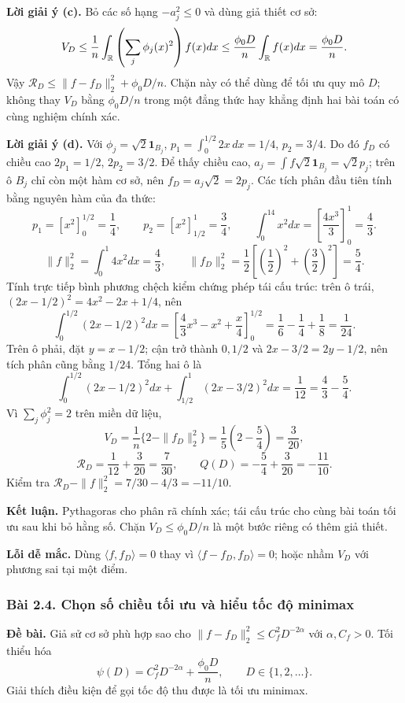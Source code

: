 \textbf{Lời giải ý (c).}
Bỏ các số hạng $-a_j^2\leq0$ và dùng giả thiết cơ sở:
\[
V_D\leq\frac1n\int_{\mathbb R}\left(\sum_j\phi_j(x)^2\right)f(x)dx
\leq\frac{\phi_0D}{n}\int_{\mathbb R}f(x)dx=\frac{\phi_0D}{n}.
\]
Vậy $\mathcal R_D\leq\|f-f_D\|_2^2+\phi_0D/n$.
Chặn này có thể dùng để tối ưu quy mô $D$; không thay $V_D$ bằng $\phi_0D/n$
trong một đẳng thức hay khẳng định hai bài toán có cùng nghiệm chính xác.

\textbf{Lời giải ý (d).}
Với $\phi_j=\sqrt2\mathbf1_{B_j}$,
$p_1=\int_0^{1/2}2x\,dx=1/4$, $p_2=3/4$.
Do đó $f_D$ có chiều cao $2p_1=1/2$, $2p_2=3/2$.
Để thấy chiều cao, $a_j=\int f\sqrt2\mathbf1_{B_j}=\sqrt2p_j$;
trên ô $B_j$ chỉ còn một hàm cơ sở, nên $f_D=a_j\sqrt2=2p_j$.
Các tích phân đầu tiên tính bằng nguyên hàm của đa thức:
\[
p_1=[x^2]_0^{1/2}=\frac14,\qquad
p_2=[x^2]_{1/2}^1=\frac34,\qquad
\int_0^14x^2dx=\left[\frac{4x^3}{3}\right]_0^1=\frac43.
\]
\[
\|f\|_2^2=\int_0^1 4x^2dx=\frac43,\qquad
\|f_D\|_2^2=\frac12\left[\left(\frac12\right)^2+\left(\frac32\right)^2\right]=\frac54.
\]
Tính trực tiếp bình phương chệch kiểm chứng phép tái cấu trúc:
trên ô trái, $(2x-1/2)^2=4x^2-2x+1/4$, nên
\[
\int_0^{1/2}(2x-1/2)^2dx
=\left[\frac43x^3-x^2+\frac x4\right]_0^{1/2}
=\frac16-\frac14+\frac18=\frac1{24}.
\]
Trên ô phải, đặt $y=x-1/2$; cận trở thành $0,1/2$ và
$2x-3/2=2y-1/2$, nên tích phân cũng bằng $1/24$.
Tổng hai ô là
\[
\int_0^{1/2}(2x-1/2)^2dx+\int_{1/2}^1(2x-3/2)^2dx
=\frac1{12}=\frac43-\frac54.
\]
Vì $\sum_j\phi_j^2=2$ trên miền dữ liệu,
\[
V_D=\frac1n\{2-\|f_D\|_2^2\}=\frac15\left(2-\frac54\right)=\frac3{20},
\]
\[
\mathcal R_D=\frac1{12}+\frac3{20}=\frac7{30},\qquad
Q(D)=-\frac54+\frac3{20}=-\frac{11}{10}.
\]
Kiểm tra $\mathcal R_D-\|f\|_2^2=7/30-4/3=-11/10$.

\textbf{Kết luận.} Pythagoras cho phân rã chính xác;
tái cấu trúc cho cùng bài toán tối ưu sau khi bỏ hằng số.
Chặn $V_D\leq\phi_0D/n$ là một bước riêng có thêm giả thiết.

\textbf{Lỗi dễ mắc.} Dùng $\langle f,f_D\rangle=0$ thay vì
$\langle f-f_D,f_D\rangle=0$; hoặc nhầm $V_D$ với phương sai tại một điểm.

\subsubsection*{Bài 2.4. Chọn số chiều tối ưu và hiểu tốc độ minimax}\label{ot45:dimension}
\textbf{Đề bài.} Giả sử cơ sở phù hợp sao cho
$\|f-f_D\|_2^2\leq C_f^2D^{-2\alpha}$ với $\alpha,C_f>0$.
Tối thiểu hóa
\[
\psi(D)=C_f^2D^{-2\alpha}+\frac{\phi_0D}{n},\qquad D\in\{1,2,\ldots\}.
\]
Giải thích điều kiện để gọi tốc độ thu được là tối ưu minimax.

